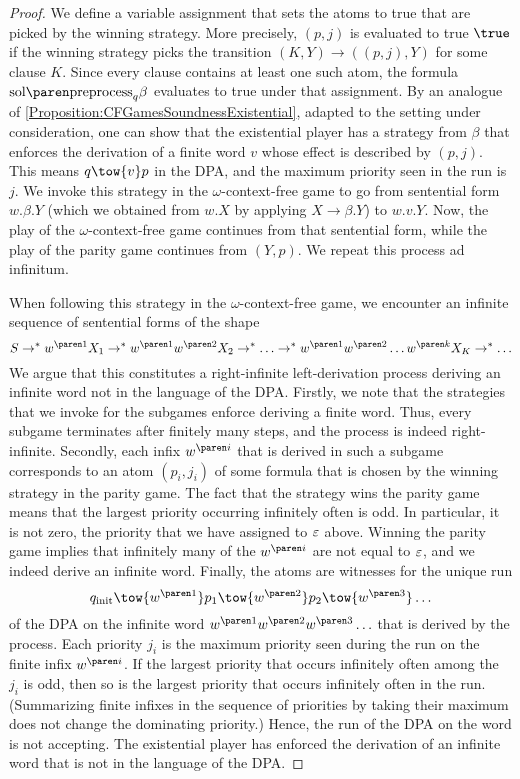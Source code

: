 \documentclass[../../diss.tex]{subfiles}
\begin{document}
\begin{proof}
    We define a variable assignment that sets the atoms to true that are picked by the winning strategy.
    More precisely, $(p,j)$ is evaluated to true $\true$ if the winning strategy picks the transition $(K,Y) \to ((p,j),Y)$ for some clause $K$.
    Since every clause contains at least one such atom, the formula $\sol{\text{preprocess}_q{\beta}}$ evaluates to true under that assignment.
    By an analogue of \cref{Proposition:CFGamesSoundnessExistential}, adapted to the setting under consideration, one can show that the existential player has a strategy from $\beta$ that enforces the derivation of a finite word $v$ whose effect is described by $(p,j)$.
    This means $q \tow{v} p$ in the DPA, and the maximum priority seen in the run is $j$.
    We invoke this strategy in the $\omega$-context-free game to go from sentential form $w.\beta.Y$ (which we obtained from $w.X$ by applying $X \to \beta.Y$) to $w.v.Y$.
    Now, the play of the $\omega$-context-free game continues from that sentential form, while the play of the parity game continues from $(Y,p)$.
    We repeat this process ad infinitum.

    When following this strategy in the $\omega$-context-free game, we encounter an infinite sequence of sentential forms of the shape
    \[
        S \to^* \itr{w}{1}X_1  \to^* \itr{w}{1}\itr{w}{2} X_2 \to^* \ldots \to^* \itr{w}{1}\itr{w}{2}\ldots\itr{w}{k} X_K \to^* \ldots
    \]
    We argue that this constitutes a right-infinite left-derivation process deriving an infinite word not in the language of the DPA.\@
    Firstly, we note that the strategies that we invoke for the subgames enforce deriving a finite word.
    Thus, every subgame terminates after finitely many steps, and the process is indeed right-infinite.
    Secondly, each infix $\itr{w}{i}$ that is derived in such a subgame corresponds to an atom $(p_i,j_i)$ of some formula that is chosen by the winning strategy in the parity game.
    The fact that the strategy wins the parity game means that the largest priority occurring infinitely often is odd.
    In particular, it is not zero, the priority that we have assigned to $\varepsilon$ above.
    Winning the parity game implies that infinitely many of the $\itr{w}{i}$ are not equal to $\varepsilon$, and we indeed derive an infinite word.
    Finally, the atoms are witnesses for the unique run
    \[
        \qinit \tow{ \itr{w}{1}} p_1 \tow{ \itr{w}{2}} p_2 \tow{ \itr{w}{3}} \ldots
    \]
    of the DPA on the infinite word $\itr{w}{1}\itr{w}{2}\itr{w}{3} \ldots $ that is derived by the process.
    Each priority $j_i$ is the maximum priority seen during the run on the finite infix $\itr{w}{i}$.
    If the largest priority that occurs infinitely often among the $j_i$ is odd, then so is the largest priority that occurs infinitely often in the run.
    (Summarizing finite infixes in the sequence of priorities by taking their maximum does not change the dominating priority.)
    Hence, the run of the DPA on the word is not accepting.
    The existential player has enforced the derivation of an infinite word that is not in the language of the DPA.\@
\end{proof}
\end{document}

